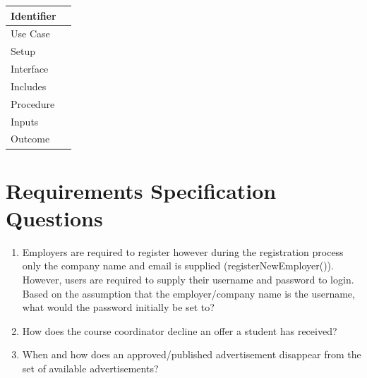 \documentclass[11pt]{article}
\begin{document}
\begin{tabularx}{\textwidth}{|T|L|}
\hline
Identifier &\\
\hline
Use Case &\\
\hline
Setup &\\
\hline
Interface &\\
\hline
Includes &\\
\hline
Procedure &\\
\hline
Inputs &\\
\hline
Outcome &\\
\hline
\end{tabularx}

\newpage

\section{Requirements Specification Questions}

\begin{enumerate}

\item{Employers are required to register however during the registration process
only the company name and email is supplied (registerNewEmployer()). However,
users are required to supply their username and password to login. Based on the
assumption that the employer/company name is the username, what would the
password initially be set to?}

\item{How does the course coordinator decline an offer a student has received?}

\item{\label{itm:advertDestroy} When and how does an approved/published 
advertisement disappear from the set of available advertisements?}

\end{enumerate}
\end{document}
